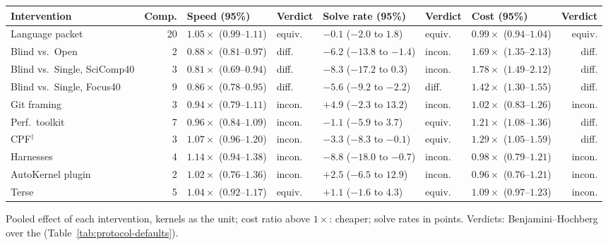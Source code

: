 
\begin{widetable}[!htbp]\revstart
\centering\scriptsize
\setlength{\tabcolsep}{1.6pt}
\begin{tabular}{@{}lrlllllr@{}}
\toprule
Intervention & Comp. & Speed (95\%) & Verdict & Solve rate (95\%) & Verdict & Cost (95\%) & Verdict  \\
\midrule
Language packet & 20 & $1.05\times$ ($0.99$--$1.11$) & equiv. & $-0.1$ ($-2.0$ to $1.8$) & equiv. & $0.99\times$ ($0.94$--$1.04$) & equiv.  \\
Blind vs.\ Open & 2 & $0.88\times$ ($0.81$--$0.97$) & diff. & $-6.2$ ($-13.8$ to $-1.4$) & incon. & $1.69\times$ ($1.35$--$2.13$) & diff.  \\
Blind vs.\ Single, SciComp40 & 3 & $0.81\times$ ($0.69$--$0.94$) & diff. & $-8.3$ ($-17.2$ to $0.3$) & incon. & $1.78\times$ ($1.49$--$2.12$) & diff.  \\
Blind vs.\ Single, Focus40 & 9 & $0.86\times$ ($0.78$--$0.95$) & diff. & $-5.6$ ($-9.2$ to $-2.2$) & diff. & $1.42\times$ ($1.30$--$1.55$) & diff.  \\
Git framing & 3 & $0.94\times$ ($0.79$--$1.11$) & incon. & $+4.9$ ($-2.3$ to $13.2$) & incon. & $1.02\times$ ($0.83$--$1.26$) & incon.  \\
Perf.\ toolkit & 7 & $0.96\times$ ($0.84$--$1.09$) & incon. & $-1.1$ ($-5.9$ to $3.7$) & equiv. & $1.21\times$ ($1.08$--$1.36$) & diff.  \\
CPF$^{\dagger}$ & 3 & $1.07\times$ ($0.96$--$1.20$) & incon. & $-3.3$ ($-8.3$ to $-0.1$) & equiv. & $1.29\times$ ($1.05$--$1.59$) & diff.  \\
Harnesses & 4 & $1.14\times$ ($0.94$--$1.38$) & incon. & $-8.8$ ($-18.0$ to $-0.7$) & incon. & $0.98\times$ ($0.79$--$1.21$) & incon.  \\
AutoKernel plugin & 2 & $1.02\times$ ($0.76$--$1.36$) & incon. & $+2.5$ ($-6.5$ to $12.9$) & incon. & $0.96\times$ ($0.76$--$1.21$) & incon.  \\
Terse & 5 & $1.04\times$ ($0.92$--$1.17$) & equiv. & $+1.1$ ($-1.6$ to $4.3$) & equiv. & $1.09\times$ ($0.97$--$1.23$) & incon.  \\
\bottomrule
\end{tabular}
\caption{Pooled effect of each intervention, kernels as the unit; cost ratio above $1\times$: cheaper; solve rates in points. Verdicts: Benjamini--Hochberg over the  (Table~\ref{tab:protocol-defaults}). }
\label{tab:pooled}
\revend\end{widetable}
